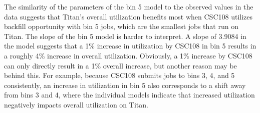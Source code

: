 The similarity of the parameters of the bin 5 model to the observed values in
the data suggests that Titan's overall utilization benefits most when CSC108
utilizes backfill opportunity with bin 5 jobs, which are the smallest jobs that
run on Titan. The slope of the bin 5 model is harder to interpret. A slope of
{3.9084} in the model suggests that a 1\% increase in utilization by CSC108 in
bin 5 results in a roughly 4\% increase in overall utilization. Obviously, a
1\% increase by CSC108 can only directly result in a 1\% overall increase, but
another reason may be behind this. For example, because CSC108 submits jobs to
bins 3, 4, and 5 consistently, an increase in utilization in bin 5 also
corresponds to a shift away from bins 3 and 4, where the individual models
indicate that increased utilization negatively impacts overall utilization on
Titan.







